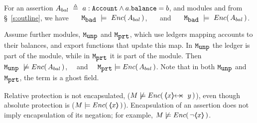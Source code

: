  

\begin{example}
\label{ex:not:encaps}
For an assertion $A_{bal}\  \triangleq\ a:\prg{Account}\wedge a.\prg{balance}=b$, %
and modules \ModB and  \ModC  from \S~\ref{s:outline}, we have  \ \ \ $\ModB\ \models\ \encaps{ A_{bal} }$, \ \ \ and \ \ \ $\ModB\ \models\ \encaps{ A_{bal} }$.
\end{example}


\begin{example} Assume   further modules, $\ModD$ and $\ModE$,  which  use ledgers mapping  accounts to their balances, and export functions that update this map. In  $\ModD$ the ledger is  part of the  module, %
while in $\ModE$ it is part of the   module.
Then  \ \ $\ModD \ \not\models\encaps{ A_{bal}} $, \ \  and \ \ $\ModE  \models \encaps{ A_{bal}} $.
Note that in both $\ModD$ and $\ModE$, the term  is a ghost field. 
\end{example}

\begin{note} Relative protection %
is not encapsulated, (\eg $M \not\models {\encaps{\protectedFrom{x}{y}}}$), even though    absolute protection is
(\eg $M \models \encaps{\inside{x}}$).
Encapsulation of an assertion does not imply encapsulation of its negation; 
 for example,  $M \not\models {\encaps{\neg\inside{x}}}$.
\end{note}


 
%

